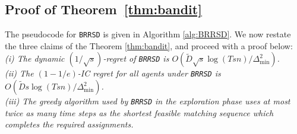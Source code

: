 \documentclass[letterpaper,11pt]{article}
\begin{document}
\subsection{Proof of Theorem~\ref{thm:bandit}}

The pseudocode for \texttt{BRRSD} is given in Algorithm \ref{alg:BRRSD}. We now restate the three claims of the Theorem \ref{thm:bandit}, and proceed with a proof below: \\
\emph{
(i) The dynamic $(1/\sqrt{s})$-regret of \texttt{BRRSD} is $O\left(\tilde{D}\sqrt{s}\log\left(Tsn\right)/\Delta^{2}_{\text{min}}\right)$. \\
(ii) The $(1-1/e)$-IC regret for all agents under \texttt{BRRSD} is $O\left(\tilde{D}s\log\left(Tsn\right)/\Delta^{2}_{\text{min}}\right)$. \\
(iii) The greedy algorithm used by \texttt{BRRSD} in the exploration phase uses at most twice as many time steps as the shortest feasible matching sequence which completes the required assignments.}
\end{document}
